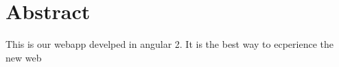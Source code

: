 \chapter{Abstract}
\label{chap:abstract}

This is our webapp develped in angular 2\cite{Angular2:online}. It is the best way to ecperience the new web